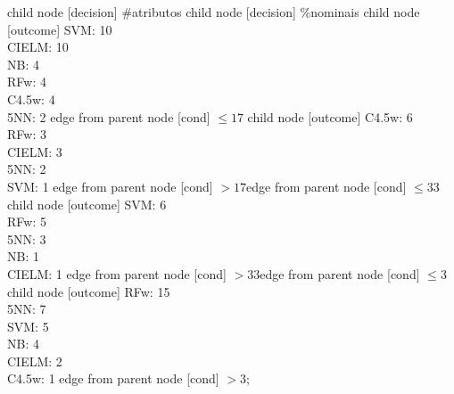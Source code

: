 child {node [decision] {\#atributos}
child {node [decision] {\%nominais}
child {node [outcome] {SVM: 10\\
CIELM: 10\\
NB: 4\\
RFw: 4\\
C4.5w: 4\\
5NN: 2} edge from parent node [cond] {$\leq17$}}
child {node [outcome] {C4.5w: 6\\
RFw: 3\\
CIELM: 3\\
5NN: 2\\
SVM: 1} edge from parent node [cond] {$>17$}}edge from parent node [cond] {$\leq33$}}
child {node [outcome] {SVM: 6\\
RFw: 5\\
5NN: 3\\
NB: 1\\
CIELM: 1} edge from parent node [cond] {$>33$}}edge from parent node [cond] {$\leq 3$}}
child {node [outcome] {RFw: 15\\
5NN: 7\\
SVM: 5\\
NB: 4\\
CIELM: 2\\
C4.5w: 1} edge from parent node [cond] {$> 3$}};